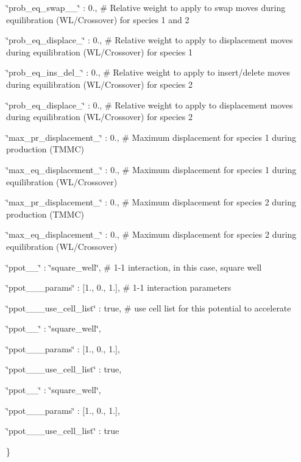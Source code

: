 \char`\"{}prob\-\_\-eq\-\_\-swap\-\_\-\_\char`\"{} \-: 0., \# Relative weight to apply to swap moves during equilibration (W\-L/\-Crossover) for species 1 and 2

\char`\"{}prob\-\_\-eq\-\_\-displace\-\_\char`\"{} \-: 0., \# Relative weight to apply to displacement moves during equilibration (W\-L/\-Crossover) for species 1

\char`\"{}prob\-\_\-eq\-\_\-ins\-\_\-del\-\_\char`\"{} \-: 0., \# Relative weight to apply to insert/delete moves during equilibration (W\-L/\-Crossover) for species 2

\char`\"{}prob\-\_\-eq\-\_\-displace\-\_\char`\"{} \-: 0., \# Relative weight to apply to displacement moves during equilibration (W\-L/\-Crossover) for species 2

\char`\"{}max\-\_\-pr\-\_\-displacement\-\_\char`\"{} \-: 0., \# Maximum displacement for species 1 during production (T\-M\-M\-C)

\char`\"{}max\-\_\-eq\-\_\-displacement\-\_\char`\"{} \-: 0., \# Maximum displacement for species 1 during equilibration (W\-L/\-Crossover)

\char`\"{}max\-\_\-pr\-\_\-displacement\-\_\char`\"{} \-: 0., \# Maximum displacement for species 2 during production (T\-M\-M\-C)

\char`\"{}max\-\_\-eq\-\_\-displacement\-\_\char`\"{} \-: 0., \# Maximum displacement for species 2 during equilibration (W\-L/\-Crossover)

\char`\"{}ppot\-\_\-\_\char`\"{} \-: \char`\"{}square\-\_\-well\char`\"{}, \# 1-\/1 interaction, in this case, square well

\char`\"{}ppot\-\_\-\_\-\_\-params\char`\"{} \-: \mbox{[}1., 0., 1.\mbox{]}, \# 1-\/1 interaction parameters

\char`\"{}ppot\-\_\-\_\-\_\-use\-\_\-cell\-\_\-list\char`\"{} \-: true, \# use cell list for this potential to accelerate

\char`\"{}ppot\-\_\-\_\char`\"{} \-: \char`\"{}square\-\_\-well\char`\"{},

\char`\"{}ppot\-\_\-\_\-\_\-params\char`\"{} \-: \mbox{[}1., 0., 1.\mbox{]},

\char`\"{}ppot\-\_\-\_\-\_\-use\-\_\-cell\-\_\-list\char`\"{} \-: true,

\char`\"{}ppot\-\_\-\_\char`\"{} \-: \char`\"{}square\-\_\-well\char`\"{},

\char`\"{}ppot\-\_\-\_\-\_\-params\char`\"{} \-: \mbox{[}1., 0., 1.\mbox{]},

\char`\"{}ppot\-\_\-\_\-\_\-use\-\_\-cell\-\_\-list\char`\"{} \-: true

\} 